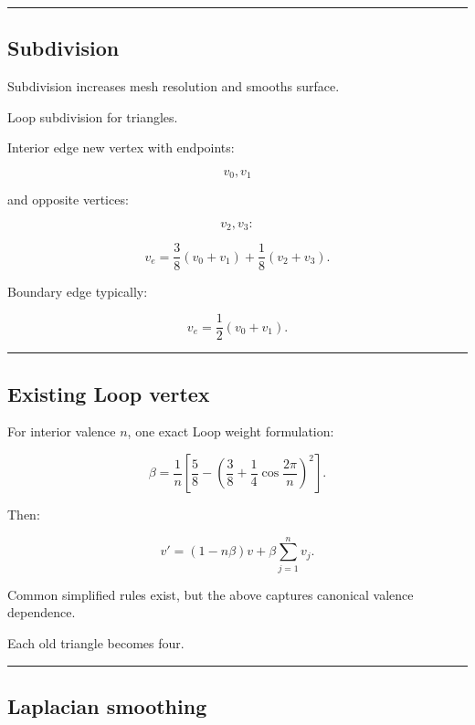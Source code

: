 \begin{center}\rule{0.5\linewidth}{0.5pt}\end{center}

\subsection{Subdivision}\label{04-visual-computing-ii-ch041-subdivision}

Subdivision increases mesh resolution and smooths surface.

Loop subdivision for triangles.

Interior edge new vertex with endpoints:

\[
v_0,v_1
\]

and opposite vertices:

\[
v_2,v_3:
\]

\[
\boxed{
v_e
=
\frac38(v_0+v_1)
+
\frac18(v_2+v_3).
}
\]

Boundary edge typically:

\[
v_e=
\frac12(v_0+v_1).
\]

\begin{center}\rule{0.5\linewidth}{0.5pt}\end{center}

\subsection{Existing Loop vertex}\label{04-visual-computing-ii-ch041-existing-loop-vertex}

For interior valence \(n\), one exact Loop weight formulation:

\[
\beta
=
\frac1n
\left[
\frac58-
\left(
\frac38+
\frac14\cos\frac{2\pi}{n}
\right)^2
\right].
\]

Then:

\[
\boxed{
v'
=
(1-n\beta)v
+
\beta
\sum_{j=1}^{n}v_j.
}
\]

Common simplified rules exist, but the above captures canonical valence dependence.

Each old triangle becomes four.

\begin{center}\rule{0.5\linewidth}{0.5pt}\end{center}

\subsection{Laplacian smoothing}\label{04-visual-computing-ii-ch041-laplacian-smoothing}

